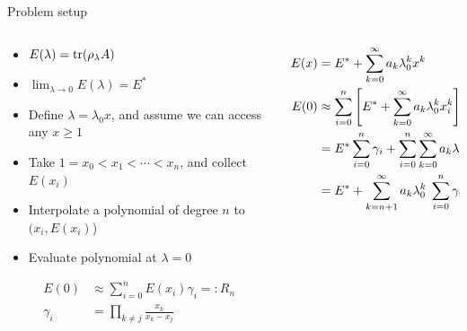 \documentclass[11pt,aspectratio=1610,xcolor=dvipsnames]{beamer}
\begin{document}
\begin{frame}{Problem setup}
	\begin{columns}
		\begin{column}{0.5\textwidth}
			\begin{itemize}
				\item $E(\lambda) = \tr(\rho_\lambda A)$
				\item $\lim_{\lambda\to 0}E(\lambda) = E^*$
				\item Define $\lambda = \lambda_0 x$, and assume we can access any $x \geq 1$
				\item Take $1 = x_0 < x_1 < \cdots < x_n$, and collect $E(x_i)$
				\item Interpolate a polynomial of degree $n$ to $(x_i, E(x_i)$)
				\item Evaluate polynomial at $\lambda = 0$
			\end{itemize}
			\begin{align*}
				E(0)     & \approx \sum_{i = 0}^n E(x_i)\gamma_i =: R_n \\
				\gamma_i & = \prod_{k \neq j}\frac{x_k}{x_k - x_j}
			\end{align*}
		\end{column}
		\begin{column}{0.5\textwidth}
			\begin{align*}
				E(x) & = E^* + \sum_{k = 0}^\infty a_k \lambda_0^k x^k                                                  \\
				E(0) & \approx \sum_{i = 0}^n\qty[E^* + \sum_{k = 0}^\infty a_k\lambda_0^k x_i^k]\gamma_i               \\
				     & = E^* \sum_{i = 0}^n \gamma_i + \sum_{i = 0}^n\sum_{k = 0}^\infty a_k \lambda_0^k \gamma_i x_i^k \\
				     & = E^* + \sum_{k = n+1}^\infty a_k\lambda_0^k \; \sum_{i = 0}^n \gamma_i x_i^k
			\end{align*}
		\end{column}
	\end{columns}
\end{frame}
\end{document}
